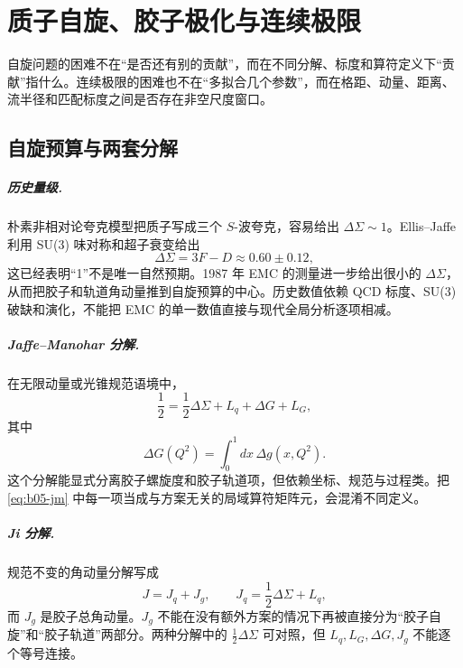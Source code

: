 \chapter{质子自旋、胶子极化与连续极限}
\label{sec:b05-spin-continuum}

自旋问题的困难不在“是否还有别的贡献”，而在不同分解、标度和算符定义下“贡献”指什么。连续极限的困难也不在“多拟合几个参数”，而在格距、动量、距离、流半径和匹配标度之间是否存在非空尺度窗口。

\section{自旋预算与两套分解}

\paragraph{历史量级.}
朴素非相对论夸克模型把质子写成三个 \(S\)-波夸克，容易给出 \(\Delta\Sigma\sim1\)。Ellis--Jaffe 利用 SU(3) 味对称和超子衰变给出
\begin{equation}
  \Delta\Sigma=3F-D\approx0.60\pm0.12,
  \label{eq:b05-ellis-jaffe}
\end{equation}
这已经表明“1”不是唯一自然预期。1987 年 EMC 的测量进一步给出很小的 \(\Delta\Sigma\)，从而把胶子和轨道角动量推到自旋预算的中心。历史数值依赖 QCD 标度、SU(3) 破缺和演化，不能把 EMC 的单一数值直接与现代全局分析逐项相减。

\paragraph{Jaffe--Manohar 分解.}
在无限动量或光锥规范语境中，
\begin{equation}
  \frac12
  =\frac12\Delta\Sigma+L_q+\Delta G+L_G,
  \label{eq:b05-jm}
\end{equation}
其中
\begin{equation}
  \Delta G(Q^2)=\int_0^1dx\,\Delta g(x,Q^2).
  \label{eq:b05-delta-g}
\end{equation}
这个分解能显式分离胶子螺旋度和胶子轨道项，但依赖坐标、规范与过程类。把 \eqref{eq:b05-jm} 中每一项当成与方案无关的局域算符矩阵元，会混淆不同定义。

\paragraph{Ji 分解.}
规范不变的角动量分解写成
\begin{equation}
  J=J_q+J_g,
  \qquad
  J_q=\frac12\Delta\Sigma+L_q,
  \label{eq:b05-ji}
\end{equation}
而 \(J_g\) 是胶子总角动量。\(J_g\) 不能在没有额外方案的情况下再被直接分为“胶子自旋”和“胶子轨道”两部分。两种分解中的 \(\frac12\Delta\Sigma\) 可对照，但 \(L_q,L_G,\Delta G,J_g\) 不能逐个等号连接。

